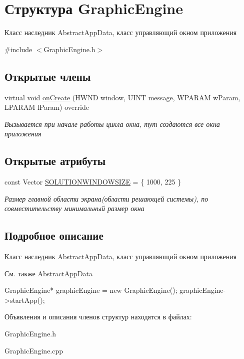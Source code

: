 \hypertarget{struct_graphic_engine}{
\section{Структура GraphicEngine}
\label{struct_graphic_engine}
}


Класс наследник AbstractAppData, класс управляющий окном приложения  




{\ttfamily \#include $<$GraphicEngine.h$>$}

\subsection*{Открытые члены}
\begin{DoxyCompactItemize}
\item 
virtual void \hyperlink{group___u_i_ga153ee021b4561079e10d503826635a0f}{onCreate} (HWND window, UINT message, WPARAM wParam, LPARAM lParam) override
\begin{DoxyCompactList}\small\item\em Вызывается при начале работы цикла окна, тут создаются все окна приложения \item\end{DoxyCompactList}\end{DoxyCompactItemize}
\subsection*{Открытые атрибуты}
\begin{DoxyCompactItemize}
\item 
const Vector \hyperlink{group___u_i_gaa5d97e29cf14f8fd13ff22d209ae9785}{SOLUTIONWINDOWSIZE} = \{ 1000, 225 \}
\begin{DoxyCompactList}\small\item\em Размер главной области экрана(области решающей системы), по совместительству минимальный размер окна \item\end{DoxyCompactList}\end{DoxyCompactItemize}


\subsection{Подробное описание}
Класс наследник AbstractAppData, класс управляющий окном приложения \begin{DoxySeeAlso}{См. также}
AbstractAppData
\end{DoxySeeAlso}

\begin{DoxyCode}
 GraphicEngine* graphicEngine = new GraphicEngine();
 graphicEngine->startApp();
\end{DoxyCode}
 

Объявления и описания членов структур находятся в файлах:\begin{DoxyCompactItemize}
\item 
GraphicEngine.h\item 
GraphicEngine.cpp\end{DoxyCompactItemize}
